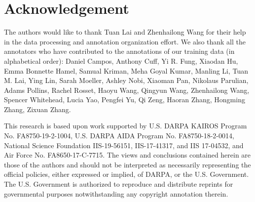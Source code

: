 \section*{Acknowledgement}
The authors would like to thank Tuan Lai and Zhenhailong Wang for their help in the data processing and annotation organization effort.
We also thank all the annotators who have contributed to the annotations of our training data (in alphabetical order): Daniel Campos, Anthony Cuff, Yi R. Fung, Xiaodan Hu, Emma Bonnette Hamel, Samual Kriman, Meha Goyal Kumar, Manling Li, Tuan M. Lai, Ying Lin, Sarah Moeller, Ashley Nobi, Xiaoman Pan, Nikolaus Parulian, Adams Pollins, Rachel Rosset, Haoyu Wang, Qingyun Wang, Zhenhailong Wang, Spencer Whitehead, Lucia Yao, Pengfei Yu, Qi Zeng, Haoran Zhang, Hongming Zhang, Zixuan Zhang.

This research is based upon work supported by U.S. DARPA KAIROS Program No. FA8750-19-2-1004, U.S. DARPA AIDA Program No. FA8750-18-2-0014, National Science Foundation IIS-19-56151, IIS-17-41317, and IIS 17-04532, and Air Force No. FA8650-17-C-7715. The views and conclusions contained herein are those of the authors and should not be interpreted as necessarily representing the official policies, either expressed or implied, of DARPA, or the U.S. Government. The U.S. Government is authorized to reproduce and distribute reprints for governmental purposes notwithstanding any copyright annotation therein.

